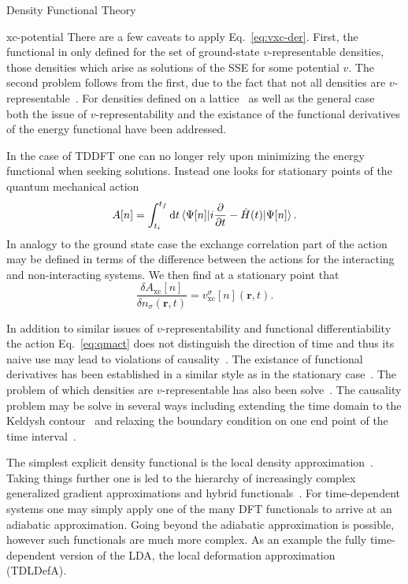 \documentclass[letterpaper, 12 pt]{report}
\begin{document}
\begin{chapter}{Density Functional Theory \label{chap:dft}}
\begin{section}{xc-potential \label{sec:xcpot}}
      There are a few caveats to apply Eq.\ \eqref{eq:vxc-der}. First, the functional in only defined
      for the set of ground-state $v$-representable densities, those densities which arise as solutions
      of the SSE for some potential $v$. The second problem follows from the first, due to the fact
      that not all densities are $v$-representable~\cite{not-vrep1, not-vrep2, not-vrep3}. For densities
      defined on a lattice~\cite{vrep-lat} as well as the general case~\cite{nonint1, nonint2,
      vrep-levy1, vrep-levy2, vrep-lieb, vrep-rev} both the issue of $v$-representability and the
      existance of the functional derivatives of the energy functional have been addressed.

      In the case of TDDFT one can no longer rely upon minimizing the energy functional when seeking
      solutions. Instead one looks for stationary points of the quantum mechanical
      action~\cite{qmaction} 
      \begin{equation} \label{eq:qmact}
         A[n] = \int^{t_f}_{t_i} \mathrm{d}t
            \braket{\Psi[n] |i\frac{\partial}{\partial t} -\hat{H}(t) | \Psi[n]}.
      \end{equation}
      In analogy to the ground state case the exchange correlation part of the action may be defined in
      terms of the difference between the actions for the interacting and non-interacting systems. We
      then find at a stationary point that
      \begin{equation} \label{eq:tdvxc-der}
         \frac{\delta A_\mathrm{xc}[n]}{\delta n_\sigma(\mathbf{r},t)}
            = v^\sigma_\mathrm{xc}[n](\mathbf{r},t).
      \end{equation}

      In addition to similar issues of $v$-representability and functional differentiability the action
      Eq.\ \eqref{eq:qmact} does not distinguish the direction of time and thus its naive use may lead
      to violations of causality~\cite{tddft-causality}. The existance of functional derivatives has
      been established in a similar style as in the stationary case~\cite{td-welldef}. The problem of
      which densities are $v$-representable has also been solve~\cite{td-vrep}. The causality problem
      may be solve in several ways including extending the time domain to the Keldysh
      contour~\cite{caus-sol1} and relaxing the boundary condition on one end point of the time
      interval~\cite{caus-sol2}.

      The simplest explicit density functional is the local density approximation~\cite{ks-eq}. Taking
      things further one is led to the hierarchy of increasingly complex generalized gradient
      approximations and hybrid functionals~\cite{gga+}. For time-dependent systems one may simply apply
      one of the many DFT functionals to arrive at an adiabatic approximation. Going beyond the
      adiabatic approximation is possible, however such functionals are much more complex. As an example
      the fully time-dependent version of the LDA, the local deformation approximation~\cite{TDLDefA1,
      TDLDefA2} (TDLDefA).


\end{section}
\end{chapter}
\end{document}
